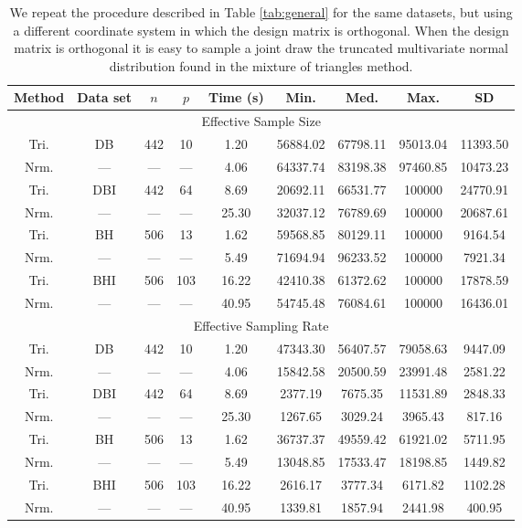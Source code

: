 \documentclass{article}
\begin{document}
\begin{table}

\centering
\begin{tabular}{c c c c c c c c c}
Method & Data set & $n$ & $p$ & Time (s) & Min. & Med. & Max. & SD \\
\hline
\multicolumn{9}{c}{Effective Sample Size} \\
Tri. & DB  & 442 &  10 & 1.20 & 56884.02 & 67798.11 & 95013.04 & 11393.50 \\
Nrm. & --- & --- & --- & 4.06 & 64337.74 & 83198.38 & 97460.85 & 10473.23 \\

Tri. & DBI & 442 &  64 &  8.69 & 20692.11 & 66531.77 & 100000 & 24770.91 \\
Nrm. & --- & --- & --- & 25.30 & 32037.12 & 76789.69 & 100000 & 20687.61 \\

Tri. & BH  & 506 &  13 &  1.62 & 59568.85 & 80129.11 & 100000 & 9164.54 \\
Nrm. & --- & --- & --- &  5.49 & 71694.94 & 96233.52 & 100000 & 7921.34 \\

Tri. & BHI & 506 & 103 & 16.22 & 42410.38 & 61372.62 & 100000 & 17878.59 \\
Nrm. & --- & --- & --- & 40.95 & 54745.48 & 76084.61 & 100000 & 16436.01 \\

\multicolumn{9}{c}{Effective Sampling Rate} \\

Tri. & DB  & 442 &  10 & 1.20 & 47343.30 & 56407.57 & 79058.63 & 9447.09 \\
Nrm. & --- & --- & --- & 4.06 & 15842.58 & 20500.59 & 23991.48 & 2581.22 \\

Tri. & DBI & 442 &  64 &  8.69 & 2377.19 & 7675.35 & 11531.89 & 2848.33 \\
Nrm. & --- & --- & --- & 25.30 & 1267.65 & 3029.24 &  3965.43 &  817.16 \\

Tri. & BH  & 506 &  13 &  1.62 & 36737.37 & 49559.42 & 61921.02 & 5711.95 \\
Nrm. & --- & --- & --- &  5.49 & 13048.85 & 17533.47 & 18198.85 & 1449.82 \\

Tri. & BHI & 506 & 103 & 16.22 & 2616.17 & 3777.34 & 6171.82 & 1102.28 \\
Nrm. & --- & --- & --- & 40.95 & 1339.81 & 1857.94 & 2441.98 &  400.95 

\end{tabular}
\caption{ We repeat the procedure described in Table \ref{tab:general} for the
  same datasets, but using a different coordinate system in which the design matrix
  is orthogonal.  When the design matrix is orthogonal it is easy to sample a
  joint draw the truncated multivariate normal distribution found in the mixture
  of triangles method.}
\label{tab:ortho}
\end{table}
\end{document}
